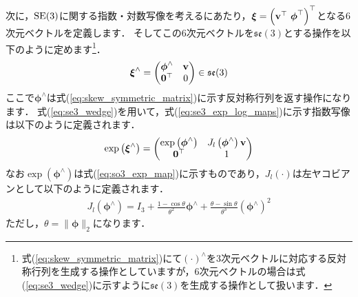 次に，${\rm SE}(3)$に関する指数・対数写像を考えるにあたり，$\boldsymbol \xi = \left( {\bf v}^{\top} ~ \boldsymbol \phi^{\top} \right)^{\top}$となる6次元ベクトルを定義します．
そしてこの6次元ベクトルを$\mathfrak{se}(3)$とする操作を以下のように定めます\footnote{式(\ref{eq:skew_symmetric_matrix})にて$\left( \cdot \right)^{\wedge}$を3次元ベクトルに対応する反対称行列を生成する操作としていますが，6次元ベクトルの場合は式(\ref{eq:se3_wedge})に示すように$\mathfrak{se}(3)$を生成する操作として扱います．}．
%
\begin{align}
  \boldsymbol \xi^{\wedge} = \left( \begin{matrix}
    \boldsymbol \phi^{\wedge} & {\bf v} \\
    {\bf 0}^{\top}            & 0
  \end{matrix} \right) \in \mathfrak{se}(3)
  \label{eq:se3_wedge}
\end{align}
%
ここで$\boldsymbol \phi^{\wedge}$は式(\ref{eq:skew_symmetric_matrix})に示す反対称行列を返す操作になります．
式(\ref{eq:se3_wedge})を用いて，式(\ref{eq:se3_exp_log_maps})に示す指数写像は以下のように定義されます．
%
\begin{align}
  \exp \left( \boldsymbol \xi^{\wedge} \right) = \left( \begin{matrix}
    \exp \left( \boldsymbol \phi^{\wedge} \right) & J_{l} \left( \boldsymbol \phi^{\wedge} \right) {\bf v} \\
    {\bf 0}^{\top}                                & 1
  \end{matrix} \right)
  \label{eq:se3_exp_map}
\end{align}
%
なお$\exp \left( \boldsymbol \phi^{\wedge} \right)$は式(\ref{eq:so3_exp_map})に示すものであり，$J_{l} \left( \cdot \right)$は左ヤコビアンとして以下のように定義されます．
%
\begin{align}
  J_{l} \left( \boldsymbol \phi^{\wedge} \right)
  =
  I_{3} +
  \frac{ 1 - \cos \theta }{ \theta^{2} } \boldsymbol \phi^{\wedge} +
  \frac{ \theta - \sin \theta }{ \theta^{3} } \left( \boldsymbol \phi^{\wedge} \right)^{2}
  \label{eq:so3_left_jacobian}
\end{align}
%
ただし，$\theta = \| \boldsymbol \phi \|_{2}$になります．

